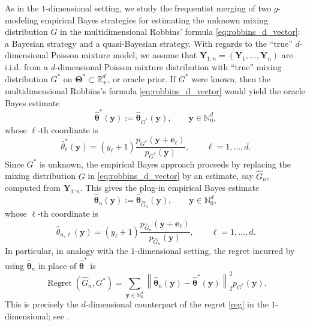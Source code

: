 \documentclass[twoside,12pt]{article}
\begin{document}
As in the $1$-dimensional setting, we study the frequentist merging of two $g$-modeling empirical Bayes strategies for estimating the unknown mixing distribution $G$ in the multidimensional Robbins' formula \eqref{eq:robbins_d_vector}: a Bayesian strategy and a quasi-Bayesian strategy. With regards to the ``true'' $d$-dimensional Poisson mixture model, we assume that $\boldsymbol Y_{1:n}=(\boldsymbol Y_1,\ldots,\boldsymbol Y_n)$ are i.i.d. from a $d$-dimensional Poisson mixture distribution with ``true'' mixing distribution $G^\ast$ on $\boldsymbol\Theta^\ast\subset\mathbb R_+^d$, or oracle prior. If $G^\ast$ were known, then the multidimensional Robbins's formula \eqref{eq:robbins_d_vector} would yield the oracle Bayes estimate
\begin{equation}\label{eq:oracle_d}
\hat{\boldsymbol\theta}^{\ast}(\boldsymbol y):=\hat{\boldsymbol\theta}_{G^\ast}(\boldsymbol y),\qquad\boldsymbol y\in\mathbb N_0^d,
\end{equation}
whose $\ell$-th coordinate is
\begin{displaymath}
\hat\theta^{\ast}_{\ell}(\boldsymbol y)=(y_\ell+1)\frac{p_{G^\ast}(\boldsymbol y+\boldsymbol e_\ell)}{p_{G^\ast}(\boldsymbol y)},\qquad \ell=1,\ldots,d.
\end{displaymath}
Since $G^\ast$ is unknown, the empirical Bayes approach proceeds by replacing the mixing distribution $G$ in \eqref{eq:robbins_d_vector} by an estimate, say $\hat G_n$, computed from $\boldsymbol Y_{1:n}$. This gives the plug-in empirical Bayes estimate
\begin{equation}\label{eq:estimate_d}
\hat{\boldsymbol\theta}_{n}(\boldsymbol y):=\hat{\boldsymbol\theta}_{\hat G_n}(\boldsymbol y),\qquad\boldsymbol y\in\mathbb N_0^d,
\end{equation}
whose $\ell$-th coordinate is
\begin{displaymath}
\hat\theta_{n,\ell}(\boldsymbol y)=(y_\ell+1)\frac{p_{\hat G_n}(\boldsymbol y+\boldsymbol e_\ell)}{p_{\hat G_n}(\boldsymbol y)},\qquad \ell=1,\ldots,d.
\end{displaymath}
In particular, in analogy with the $1$-dimensional setting, the regret incurred by using \(\hat{\boldsymbol\theta}_{n}\) in place of \(\hat{\boldsymbol\theta}^{\ast}\) is
\begin{equation}\label{reg_d}
\operatorname{Regret}(\hat G_n,G^\ast)=\sum_{\boldsymbol y\in\mathbb N_0^d}\left\|\hat{\boldsymbol\theta}_{n}(\boldsymbol y)-\hat{\boldsymbol\theta}^{\ast}(\boldsymbol y)
\right\|_2^2p_{G^\ast}(\boldsymbol y).
\end{equation}
This is precisely the $d$-dimensional counterpart of the regret \eqref{reg} in the $1$-dimensional; see \citet{Efr(14),Efr(19)}.
\end{document}
